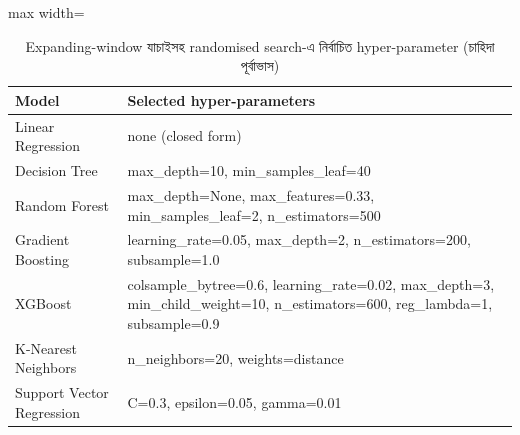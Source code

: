 \begin{table}[htbp]
\centering
\footnotesize
\caption{Expanding-window যাচাইসহ randomised search-এ নির্বাচিত hyper-parameter (চাহিদা পূর্বাভাস)}
\label{tab:hyper}
\begin{adjustbox}{max width=\linewidth}
\begin{tabular}{l>{\raggedright\arraybackslash}p{10cm}}
\toprule
\textbf{Model} & \textbf{Selected hyper-parameters} \\
\midrule
Linear Regression & none (closed form) \\
Decision Tree & max\_depth=10, min\_samples\_leaf=40 \\
Random Forest & max\_depth=None, max\_features=0.33, min\_samples\_leaf=2, n\_estimators=500 \\
Gradient Boosting & learning\_rate=0.05, max\_depth=2, n\_estimators=200, subsample=1.0 \\
XGBoost & colsample\_bytree=0.6, learning\_rate=0.02, max\_depth=3, min\_child\_weight=10, n\_estimators=600, reg\_lambda=1, subsample=0.9 \\
K-Nearest Neighbors & n\_neighbors=20, weights=distance \\
Support Vector Regression & C=0.3, epsilon=0.05, gamma=0.01 \\
\bottomrule
\end{tabular}
\end{adjustbox}
\end{table}